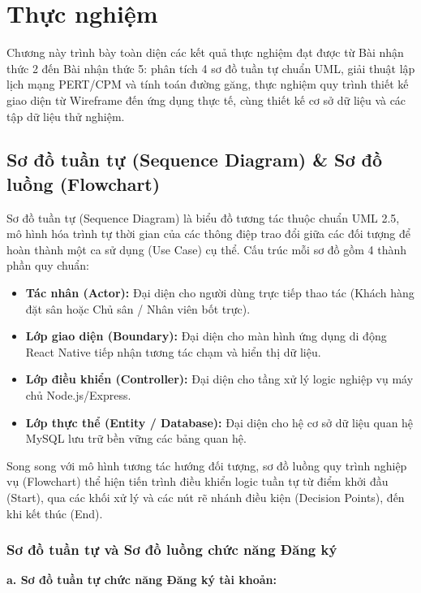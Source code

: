 \chapter{Thực nghiệm}
\label{ch:thuc-nghiem}

\begin{muctieu}
Chương này trình bày toàn diện các kết quả thực nghiệm đạt được từ Bài nhận thức 2 đến Bài nhận thức 5: phân tích 4 sơ đồ tuần tự chuẩn UML, giải thuật lập lịch mạng PERT/CPM và tính toán đường găng, thực nghiệm quy trình thiết kế giao diện từ Wireframe đến ứng dụng thực tế, cùng thiết kế cơ sở dữ liệu và các tập dữ liệu thử nghiệm.
\end{muctieu}

\section{Sơ đồ tuần tự (Sequence Diagram) \& Sơ đồ luồng (Flowchart)}
\label{sec:sequence-diagram}

Sơ đồ tuần tự (Sequence Diagram) là biểu đồ tương tác thuộc chuẩn UML 2.5, mô hình hóa trình tự thời gian của các thông điệp trao đổi giữa các đối tượng để hoàn thành một ca sử dụng (Use Case) cụ thể. Cấu trúc mỗi sơ đồ gồm 4 thành phần quy chuẩn:
\begin{itemize}
    \item \textbf{Tác nhân (Actor):} Đại diện cho người dùng trực tiếp thao tác (Khách hàng đặt sân hoặc Chủ sân / Nhân viên bốt trực).
    \item \textbf{Lớp giao diện (Boundary):} Đại diện cho màn hình ứng dụng di động React Native tiếp nhận tương tác chạm và hiển thị dữ liệu.
    \item \textbf{Lớp điều khiển (Controller):} Đại diện cho tầng xử lý logic nghiệp vụ máy chủ Node.js/Express.
    \item \textbf{Lớp thực thể (Entity / Database):} Đại diện cho hệ cơ sở dữ liệu quan hệ MySQL lưu trữ bền vững các bảng quan hệ.
\end{itemize}
Song song với mô hình tương tác hướng đối tượng, sơ đồ luồng quy trình nghiệp vụ (Flowchart) thể hiện tiến trình điều khiển logic tuần tự từ điểm khởi đầu (Start), qua các khối xử lý và các nút rẽ nhánh điều kiện (Decision Points), đến khi kết thúc (End).

\subsection{Sơ đồ tuần tự và Sơ đồ luồng chức năng Đăng ký}
\textbf{a. Sơ đồ tuần tự chức năng Đăng ký tài khoản:}

